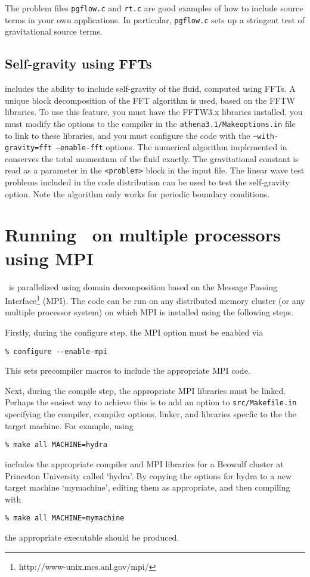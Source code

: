 The problem files {\tt pgflow.c} and {\tt rt.c} are good examples
of how to include source terms in your own applications.  In particular,
{\tt pgflow.c} sets up a stringent test of gravitational source terms.

\subsection{Self-gravity using FFTs}

\ath includes the ability to include self-gravity of the fluid, computed
using FFTs.  A unique block decomposition of the FFT algorithm is used, based
on the FFTW libraries.  To use this feature, you must have the FFTW3.x
libraries installed, you must modify the options to the compiler in the
{\tt athena3.1/Makeoptions.in} file to link to these libraries, and
you must configure the code with the {\tt --with-gravity=fft --enable-fft}
options.  The numerical algorithm implemented in \ath conserves the total
momentum of the fluid exactly.   The gravitational constant is read as a 
parameter in the {\tt <problem>} block in the input file.
The linear wave test problems
included in the code distribution can be used to test the self-gravity
option.  Note the algorithm only works for periodic boundary conditions.

\section{Running \ath\ on multiple processors using MPI}

\ath\ is parallelized using domain decomposition based on the
Message Passing Interface\footnote{http://www-unix.mcs.anl.gov/mpi/} (MPI).
The code can be run on any distributed memory cluster (or any multiple
processor system) on which MPI is installed using the following steps.

Firstly, during the configure step, the MPI option must be enabled via
\begin{verbatim}
% configure --enable-mpi
\end{verbatim}
This sets precompiler macros to include the appropriate MPI code.

Next, during the compile step, the appropriate MPI libraries must be
linked.  Perhaps the easiest way to achieve this is to add an option
to {\tt src/Makefile.in} specifying the compiler, compiler options, linker,
and libraries specfic to the the target machine.  For example, using
\begin{verbatim}
% make all MACHINE=hydra
\end{verbatim}
includes the appropriate compiler and MPI libraries for a Beowulf cluster
at Princeton University called `hydra'.  By copying the options for hydra
to a new target machine `mymachine', editing them as appropriate, and
then compiling with
\begin{verbatim}
% make all MACHINE=mymachine
\end{verbatim}
the appropriate executable should be produced.

